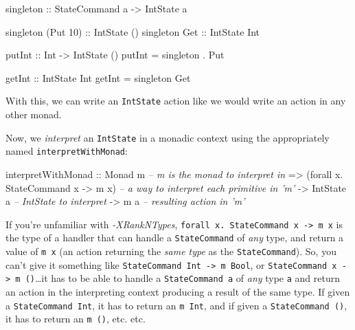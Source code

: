 \documentclass[]{article}
\newenvironment{Shaded}{}{}
\newcommand{\CommentTok}[1]{\textcolor[rgb]{0.38,0.63,0.69}{\textit{#1}}}
\newcommand{\DataTypeTok}[1]{\textcolor[rgb]{0.56,0.13,0.00}{#1}}
\newcommand{\DecValTok}[1]{\textcolor[rgb]{0.25,0.63,0.44}{#1}}
\newcommand{\FunctionTok}[1]{\textcolor[rgb]{0.02,0.16,0.49}{#1}}
\newcommand{\NormalTok}[1]{#1}
\newcommand{\OtherTok}[1]{\textcolor[rgb]{0.00,0.44,0.13}{#1}}
\begin{document}
\begin{Shaded}
\begin{Highlighting}[]
\OtherTok{singleton ::} \DataTypeTok{StateCommand}\NormalTok{ a }\OtherTok{->} \DataTypeTok{IntState}\NormalTok{ a}

\NormalTok{singleton (}\DataTypeTok{Put} \DecValTok{10}\NormalTok{)}\OtherTok{ ::} \DataTypeTok{IntState}\NormalTok{ ()}
\NormalTok{singleton }\DataTypeTok{Get}\OtherTok{      ::} \DataTypeTok{IntState} \DataTypeTok{Int}

\OtherTok{putInt ::} \DataTypeTok{Int} \OtherTok{->} \DataTypeTok{IntState}\NormalTok{ ()}
\NormalTok{putInt }\FunctionTok{=}\NormalTok{ singleton }\FunctionTok{.} \DataTypeTok{Put}

\OtherTok{getInt ::} \DataTypeTok{IntState} \DataTypeTok{Int}
\NormalTok{getInt }\FunctionTok{=}\NormalTok{ singleton }\DataTypeTok{Get}
\end{Highlighting}
\end{Shaded}

With this, we can write an \texttt{IntState} action like we would write an
action in any other monad.

Now, we \emph{interpret} an \texttt{IntState} in a monadic context using the
appropriately named \texttt{interpretWithMonad}:

\begin{Shaded}
\begin{Highlighting}[]
\NormalTok{interpretWithMonad}
\OtherTok{    ::} \DataTypeTok{Monad}\NormalTok{ m                              }\CommentTok{-- m is the monad to interpret in}
    \OtherTok{=>}\NormalTok{ (forall x}\FunctionTok{.} \DataTypeTok{StateCommand}\NormalTok{ x }\OtherTok{->}\NormalTok{ m x)    }\CommentTok{-- a way to interpret each primitive in 'm'}
    \OtherTok{->} \DataTypeTok{IntState}\NormalTok{ a                           }\CommentTok{-- IntState to interpret}
    \OtherTok{->}\NormalTok{ m a                                  }\CommentTok{-- resulting action in 'm'}
\end{Highlighting}
\end{Shaded}

If you're unfamiliar with \emph{-XRankNTypes},
\texttt{forall\ x.\ StateCommand\ x\ -\textgreater{}\ m\ x} is the type of a
handler that can handle a \texttt{StateCommand} of \emph{any} type, and return a
value of \texttt{m\ x} (an action returning the \emph{same type} as the
\texttt{StateCommand}). So, you can't give it something like
\texttt{StateCommand\ Int\ -\textgreater{}\ m\ Bool}, or
\texttt{StateCommand\ x\ -\textgreater{}\ m\ ()}\ldots{}it has to be able to
handle a \texttt{StateCommand\ a} of \emph{any} type \texttt{a} and return an
action in the interpreting context producing a result of the same type. If given
a \texttt{StateCommand\ Int}, it has to return an \texttt{m\ Int}, and if given
a \texttt{StateCommand\ ()}, it has to return an \texttt{m\ ()}, etc. etc.
\end{document}
